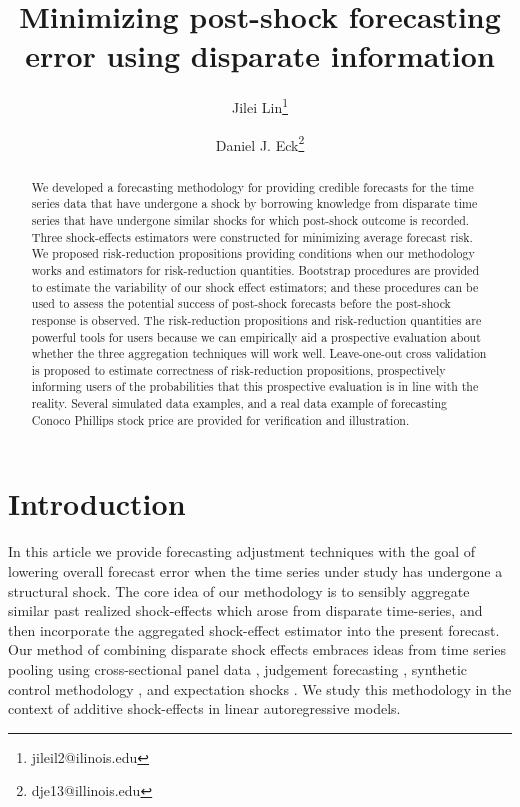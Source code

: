 \documentclass[11pt]{article}
\title{Minimizing post-shock forecasting error using disparate information}
\author{Jilei Lin\thanks{jileil2@ilinois.edu} }
\author{Daniel J. Eck\thanks{dje13@illinois.edu}}
\affil{Department of Statistics, University of Illinois at Urbana-Champaign}
\theoremstyle{definition}
\begin{document}
\maketitle
\begin{abstract}
    We developed a forecasting methodology for providing credible forecasts for the time series data that have undergone a shock  by borrowing knowledge from disparate time series that have undergone similar shocks for which post-shock outcome is recorded. Three shock-effects estimators were constructed for minimizing average forecast risk. We proposed risk-reduction propositions providing conditions when our methodology works and estimators for risk-reduction quantities. Bootstrap procedures are provided to estimate the variability of our shock effect estimators; and these procedures can be used to assess the potential success of post-shock forecasts before the post-shock response is observed. The risk-reduction propositions and risk-reduction quantities are powerful tools for users because we can empirically aid a prospective evaluation about whether the three aggregation techniques  will work well. Leave-one-out cross validation is proposed to estimate correctness of risk-reduction propositions, prospectively informing users of the probabilities that this prospective evaluation is in line with the reality. Several simulated data examples, and a real data example of forecasting Conoco Phillips stock price are provided for verification and illustration.
\end{abstract}




\section{Introduction}

In this article we provide forecasting adjustment techniques with the goal of lowering overall forecast error when the time series under study has undergone a structural shock. The core idea of our methodology is to sensibly aggregate similar past realized shock-effects which arose from disparate time-series, and then incorporate the aggregated shock-effect estimator into the present forecast. Our method of combining disparate shock effects embraces ideas from time series pooling using cross-sectional panel data \citep{ramaswamy1993empirical, pesaran1999pooled, hoogstrate2000pooling, baltagi2008forecasting, koop2012forecasting, liu2020forecasting}, judgement forecasting \citep{svensson2005monetary, monti2008forecast}, synthetic control methodology \citep{abadie2010synthetic, agarwal2020two}, and expectation shocks \citep{croushore2006data, clements2019measuring}. We study this methodology in the context of additive shock-effects in linear autoregressive models. 
\end{document}

